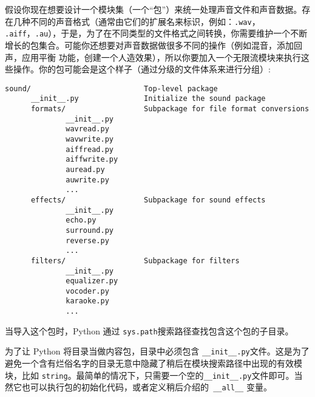 假设你现在想要设计一个模块集（一个“包”）来统一处理声音文件和声音数据。存在几种不同的声音格式（通常由它们的扩展名来标识，例如：\verb|.wav|， \verb|.aiff|，\verb|.au|），于是，为了在不同类型的文件格式之间转换，你需要维护一个不断增长的包集合。可能你还想要对声音数据做很多不同的操作（例如混音，添加回声，应用平衡 功能，创建一个人造效果），所以你要加入一个无限流模块来执行这些操作。你的包可能会是这个样子（通过分级的文件体系来进行分组）:
\begin{Verbatim}[fontfamily=tt]
sound/                          Top-level package
      __init__.py               Initialize the sound package
      formats/                  Subpackage for file format conversions
              __init__.py
              wavread.py
              wavwrite.py
              aiffread.py
              aiffwrite.py
              auread.py
              auwrite.py
              ...
      effects/                  Subpackage for sound effects
              __init__.py
              echo.py
              surround.py
              reverse.py
              ...
      filters/                  Subpackage for filters
              __init__.py
              equalizer.py
              vocoder.py
              karaoke.py
              ...
\end{Verbatim}
当导入这个包时，Python 通过 \texttt{sys.path}搜索路径查找包含这个包的子目录。

为了让 Python 将目录当做内容包，目录中必须包含 \cprotect\texttt{\verb|__init__|.py}文件。这是为了避免一个含有烂俗名字的目录无意中隐藏了稍后在模块搜索路径中出现的有效模块，比如
\verb|string|。最简单的情况下，只需要一个空的\cprotect\texttt{\verb|__init__|.py}文件即可。当然它也可以执行包的初始化代码，或者定义稍后介绍的\cprotect\texttt{\verb| __all__|} 变量。

